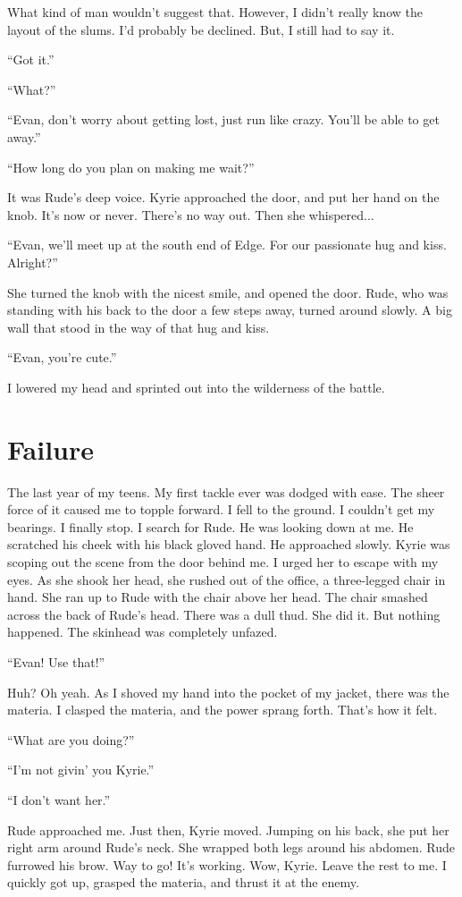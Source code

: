 \documentclass[oneside]{book}
\begin{document}
What kind of man wouldn’t suggest that. However, I didn’t really know the layout of the slums. I’d probably be declined. But, I still had to say it.

“Got it.”

“What?”

“Evan, don’t worry about getting lost, just run like crazy. You’ll be able to get away.”

“How long do you plan on making me wait?”

It was Rude’s deep voice. Kyrie approached the door, and put her hand on the knob. It’s now or never. There’s no way out. Then she whispered...

“Evan, we’ll meet up at the south end of Edge. For our passionate hug and kiss. Alright?”

She turned the knob with the nicest smile, and opened the door. Rude, who was standing with his back to the door a few steps away, turned around slowly. A big wall that stood in the way of that hug and kiss.

“Evan, you’re cute.”

I lowered my head and sprinted out into the wilderness of the battle.

\chapter{Failure}
The last year of my teens. My first tackle ever was dodged with ease. The sheer force of it caused me to topple forward. I fell to the ground. I couldn’t get my bearings. I finally stop. I search for Rude. He was looking down at me. He scratched his cheek with his black gloved hand. He approached slowly. Kyrie was scoping out the scene from the door behind me. I urged her to escape with my eyes. As she shook her head, she rushed out of the office, a three-legged chair in hand. She ran up to Rude with the chair above her head. The chair smashed across the back of Rude’s head. There was a dull thud. She did it. But nothing happened. The skinhead was completely unfazed.

“Evan! Use that!”

Huh? Oh yeah. As I shoved my hand into the pocket of my jacket, there was the materia. I clasped the materia, and the power sprang forth. That’s how it felt.

“What are you doing?”

“I’m not givin’ you Kyrie.”

“I don’t want her.”

Rude approached me. Just then, Kyrie moved. Jumping on his back, she put her right arm around Rude’s neck. She wrapped both legs around his abdomen. Rude furrowed his brow. Way to go! It’s working. Wow, Kyrie. Leave the rest to me. I quickly got up, grasped the materia, and thrust it at the enemy.
\end{document}
